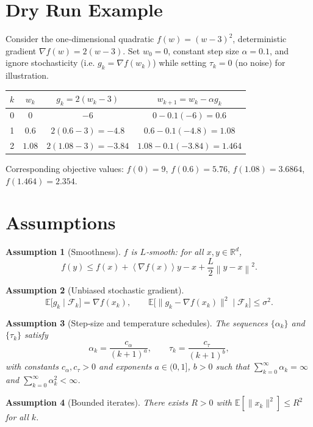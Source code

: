 \documentclass{article}
\newtheorem{assumption}{Assumption}
\newcommand{\EE}{\mathbb{E}}
\newcommand{\RR}{\mathbb{R}}
\newcommand{\norm}[1]{\left\lVert #1\right\rVert}
\newcommand{\inner}[1]{\left\langle #1\right\rangle}
\begin{document}
\section*{Dry Run Example}
Consider the one‑dimensional quadratic $f(w)=(w-3)^{2}$, deterministic gradient $\nabla f(w)=2(w-3)$.  
Set $w_{0}=0$, constant step size $\alpha=0.1$, and ignore stochasticity (i.e. $g_{k}=\nabla f(w_{k})$) while setting $\tau_{k}=0$ (no noise) for illustration.

\begin{center}
\begin{tabular}{c|c|c|c}
$k$ & $w_{k}$ & $g_{k}=2(w_{k}-3)$ & $w_{k+1}=w_{k}-\alpha g_{k}$ \\ \hline
0 & $0$ & $-6$ & $0-0.1(-6)=0.6$ \\
1 & $0.6$ & $2(0.6-3)=-4.8$ & $0.6-0.1(-4.8)=1.08$ \\
2 & $1.08$ & $2(1.08-3)=-3.84$ & $1.08-0.1(-3.84)=1.464$ \\
\end{tabular}
\end{center}

Corresponding objective values: $f(0)=9$, $f(0.6)=5.76$, $f(1.08)=3.6864$, $f(1.464)=2.354$.

\section*{Assumptions}
\begin{assumption}[Smoothness]\label{as:smooth}
$f$ is $L$‑smooth: for all $x,y\in\RR^{d}$,
\[
f(y)\le f(x)+\inner{\nabla f(x)}{y-x}+\frac{L}{2}\norm{y-x}^{2}.
\tag{2}
\]
\end{assumption}
\begin{assumption}[Unbiased stochastic gradient]\label{as:unbiased}
\[
\EE\!\bigl[g_{k}\mid\mathcal F_{k}\bigr]=\nabla f(x_{k}),\qquad 
\EE\!\bigl[\|g_{k}-\nabla f(x_{k})\|^{2}\mid\mathcal F_{k}\bigr]\le\sigma^{2}.
\tag{3}
\]
\end{assumption}
\begin{assumption}[Step‑size and temperature schedules]\label{as:schedules}
The sequences $\{\alpha_{k}\}$ and $\{\tau_{k}\}$ satisfy  
\[
\alpha_{k}= \frac{c_{\alpha}}{(k+1)^{a}},\qquad 
\tau_{k}= \frac{c_{\tau}}{(k+1)^{b}},
\tag{4}
\]
with constants $c_{\alpha},c_{\tau}>0$ and exponents $a\in(0,1]$, $b>0$ such that $\sum_{k=0}^{\infty}\alpha_{k}= \infty$ and $\sum_{k=0}^{\infty}\alpha_{k}^{2}<\infty$.
\end{assumption}
\begin{assumption}[Bounded iterates]\label{as:bounded}
There exists $R>0$ with $\EE[\|x_{k}\|^{2}]\le R^{2}$ for all $k$.
\end{assumption}
\end{document}
